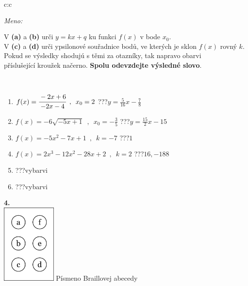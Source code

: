 \documentclass[10pt]{report}
\begin{document}
\begin{tabular}{c:c}
\begin{minipage}[c][104.5mm][t]{0.5\linewidth}
\begin{center}
\textit{Meno:}\phantom{xxxxxxxxxxxxxxxxxxxxxxxxxxxxxxxxxxxxxxxxxxxxxxxxxxxxxxxxxxxxxxxxx}\\[5mm]
\begin{minipage}{0.95\linewidth}
\begin{center}
V \textbf{(a)} a \textbf{(b)} urči  $y = kx + q$ ku funkci $f(x)$ v bode $x_0$.\\V \textbf{(c)} a \textbf{(d)} urči ypsilonové souřadnice bodů, ve kterých je sklon $f(x)$ rovný $k$.\\Pokud se výsledky shodujú s těmi za otazníky, tak napravo obarvi\\příslušející kroužek načerno. \textbf{Spolu odevzdejte výsledné slovo}.
\end{center}
\end{minipage}
\\[1mm]
\begin{minipage}{0.79\linewidth}
\begin{center}
\begin{varwidth}{\linewidth}
\begin{enumerate}
\small
\item $f(x)=\cfrac{-2x+6}{-2x-4}\enspace , \enspace x_0=2$\quad \dotfill\; ???\;\dotfill \quad $y = \frac{5}{16}x-\frac{7}{8}$
\item $f(x)=-6\sqrt{-5x+1}\enspace , \enspace x_0=-\frac{3}{5}$\quad \dotfill\; ???\;\dotfill \quad $y = \frac{15}{2}x-15$
\item $f(x)=-5x^2-7x+1\enspace , \enspace k=-7$\quad \dotfill\; ???\;\dotfill \quad $1$
\item $f(x)=2x^3-12x^2-28x+2\enspace , \enspace k=2$\quad \dotfill\; ???\;\dotfill \quad $16 , -188$
\item \quad \dotfill\; ???\;\dotfill \quad vybarvi
\item \quad \dotfill\; ???\;\dotfill \quad vybarvi
\end{enumerate}
\end{varwidth}
\end{center}
\end{minipage}
\begin{minipage}{0.20\linewidth}
\begin{center}
{\Huge\bfseries 4.} \\[2mm]
\includegraphics[height=40mm]{../images/braille.png}
{\small Písmeno Braillovej abecedy}
\end{center}
\end{minipage}
\end{center}
\end{minipage}
%
\end{tabular}
\end{document}
